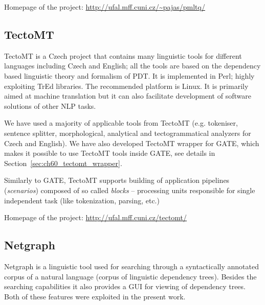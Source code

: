 \medskip
Homepage of the project: \url{http://ufal.mff.cuni.cz/~pajas/pmltq/}



\subsection{TectoMT} \label{sec:ch30_tectomt}

TectoMT \citep{biblio:ZaPtTectoMTHighly2008} is a Czech project that contains many linguistic tools for different languages including Czech and English; all the tools are based on the dependency based linguistic theory and formalism of PDT. It is implemented in Perl; highly exploiting TrEd libraries. The recommended platform is Linux. %
It is primarily aimed at machine translation but it can also facilitate development of software solutions of other NLP tasks.

We have used a majority of applicable tools from TectoMT (e.g. tokeniser, sentence splitter, morphological, analytical and tectogrammatical analyzers for Czech and English). We have also developed TectoMT wrapper for GATE, which makes it possible to use TectoMT tools inside GATE, see details in Section~\ref{sec:ch60_tectomt_wrapper}.

Similarly to GATE, TectoMT supports building of application pipelines (\emph{scenarios}) composed of so called \emph{blocks} -- processing units responsible for single independent task (like tokenization, parsing, etc.)

\medskip
Homepage of the project: \url{http://ufal.mff.cuni.cz/tectomt/}


\subsection{Netgraph} \label{sec:ch30_netgraph}

Netgraph \citep{biblio:MiNetgraphA2006} is a linguistic tool used for searching through a syntactically annotated corpus of a natural language (corpus of linguistic dependency trees). Besides the searching capabilities it also provides a GUI for viewing of dependency trees. Both of these features were exploited in the present work.

